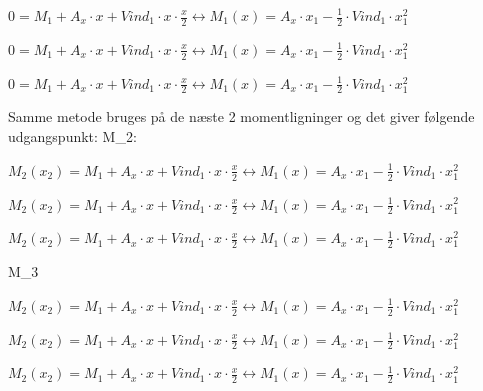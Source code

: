 \begin{center}
	$0 = M_1 + A_x \cdot x + Vind_1\cdot x\cdot \frac{x}{2} \leftrightarrow M_1(x) = A_x\cdot x_1 -\frac{1}{2}\cdot Vind_1 \cdot x_1^2$
\end{center}

\begin{center}
	$0 = M_1 + A_x \cdot x + Vind_1\cdot x\cdot \frac{x}{2} \leftrightarrow M_1(x) = A_x\cdot x_1 -\frac{1}{2}\cdot Vind_1 \cdot x_1^2$
\end{center}

\begin{center}
	$0 = M_1 + A_x \cdot x + Vind_1\cdot x\cdot \frac{x}{2} \leftrightarrow M_1(x) = A_x\cdot x_1 -\frac{1}{2}\cdot Vind_1 \cdot x_1^2$
\end{center}

Samme metode bruges på de næste 2 momentligninger og det giver følgende udgangspunkt: 
\newline
M_2:
\begin{center}
	$M_2(x_2) = M_1 + A_x \cdot x + Vind_1\cdot x\cdot \frac{x}{2} \leftrightarrow M_1(x) = A_x\cdot x_1 -\frac{1}{2}\cdot Vind_1 \cdot x_1^2$
\end{center}

\begin{center}
	$M_2(x_2) = M_1 + A_x \cdot x + Vind_1\cdot x\cdot \frac{x}{2} \leftrightarrow M_1(x) = A_x\cdot x_1 -\frac{1}{2}\cdot Vind_1 \cdot x_1^2$
\end{center}

\begin{center}
	$M_2(x_2) = M_1 + A_x \cdot x + Vind_1\cdot x\cdot \frac{x}{2} \leftrightarrow M_1(x) = A_x\cdot x_1 -\frac{1}{2}\cdot Vind_1 \cdot x_1^2$
\end{center}

M_3 

\begin{center}
	$M_2(x_2) = M_1 + A_x \cdot x + Vind_1\cdot x\cdot \frac{x}{2} \leftrightarrow M_1(x) = A_x\cdot x_1 -\frac{1}{2}\cdot Vind_1 \cdot x_1^2$
\end{center}

\begin{center}
	$M_2(x_2) = M_1 + A_x \cdot x + Vind_1\cdot x\cdot \frac{x}{2} \leftrightarrow M_1(x) = A_x\cdot x_1 -\frac{1}{2}\cdot Vind_1 \cdot x_1^2$
\end{center}

\begin{center}
	$M_2(x_2) = M_1 + A_x \cdot x + Vind_1\cdot x\cdot \frac{x}{2} \leftrightarrow M_1(x) = A_x\cdot x_1 -\frac{1}{2}\cdot Vind_1 \cdot x_1^2$
\end{center}

